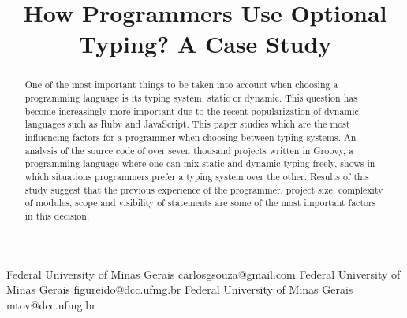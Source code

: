 \documentclass[preprint]{sigplanconf}
\begin{document}
\setlength{\pdfpageheight}{\paperheight}
\setlength{\pdfpagewidth}{\paperwidth}






\title{How Programmers Use Optional Typing? A Case Study}

           {Federal University of Minas Gerais}
           {carlosgsouza@gmail.com}
           {Federal University of Minas Gerais}
           {figureido@dcc.ufmg.br}
           {Federal University of Minas Gerais}
           {mtov@dcc.ufmg.br}

\maketitle

\begin{abstract}
One of the most important things to be taken into account when choosing a programming language is its typing system, static or dynamic. 
This question has become increasingly more important due to the recent popularization of dynamic languages such as Ruby and JavaScript. 
This paper studies which are the most influencing factors for a programmer when choosing between typing systems. 
An analysis of the source code of over seven thousand projects written in Groovy, a programming language where one can mix static and dynamic typing freely, shows in which situations programmers prefer a typing system over the other. 
Results of this study suggest that the previous experience of the programmer, project size, complexity of modules, scope and visibility of statements are some of the most important factors in this decision.
\end{abstract}
\end{document}
